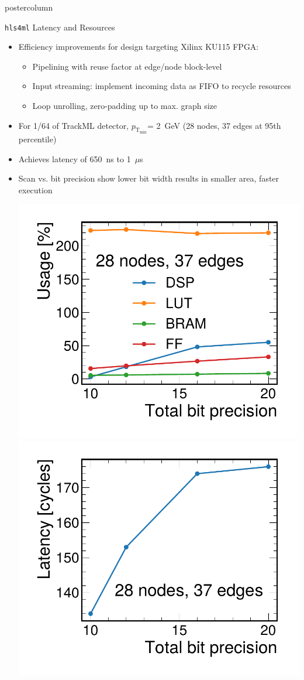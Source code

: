 \documentclass[final,hyperref={pdfpagelabels=false}]{beamer}
\newlength{\columnheight}
\newcommand{\hlsfml}{{\texttt{hls4ml}}\xspace}
\newcommand{\ptmin}{\ensuremath{p_{\mathrm{T_{min}}}}\xspace}
\begin{document}
\begin{frame}
\begin{columns}
    \begin{column}{.33\textwidth}
      \begin{beamercolorbox}[center,wd=\textwidth]{postercolumn}
        \begin{minipage}[T]{.95\textwidth} 
          \parbox[t][\columnheight]{\textwidth}{
            
            \begin{block}{\hlsfml Latency and Resources}
              \begin{itemize}
                \item Efficiency improvements for design targeting Xilinx KU115 FPGA:
                \begin{itemize}
                    \item Pipelining with reuse factor at edge/node block-level
                    \item Input streaming: implement incoming data as FIFO to recycle resources
                    \item Loop unrolling, zero-padding up to max. graph size
                \end{itemize}
                \item For 1/64 of TrackML detector, \ptmin = 2~GeV (28 nodes, 37 edges at 95th percentile)
                \item Achieves latency of 650~ns to 1~$\mu$s
                \item Scan vs. bit precision show lower bit width results in smaller area, faster execution
                \begin{center}
                    \includegraphics[width=0.49\linewidth]{figures/Resources_vs_BP.pdf}
                    \includegraphics[width=0.49\linewidth]{figures/Latency_vs_BP.pdf}

\end{center}
\end{itemize}
\end{block}}
\end{minipage}
\end{beamercolorbox}
\end{column}
\end{columns}
\end{frame}
\end{document}
